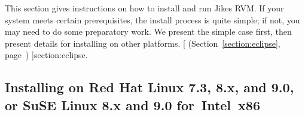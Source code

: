 \newcommand{\AtManualClasspathRootDiscussion}[1]{at
 \link{the discussion of setting up \texttt{CLASSPATH\_ROOT}#1}[; it's in
 Section~\ref{sec:manual-classpath-root}, item~\Ref,
 sub-item~\texttt{CLASS\-PATH\_\-ROOT}, on page~\Pageref]{manual-classpath-root}.}%
This section gives instructions on how to install and run Jikes\TMweb{} RVM.\@
If your system meets certain prerequisites, the install process is
quite simple; if not, you may need to do some preparatory work.  We
present the simple case first, then present details for installing
on other platforms.  
%
[
 (Section~\ref{section:eclipse}, page~\pageref{section:eclipse})%
]{section:eclipse}.\@

\subsection{Installing on Red Hat Linux 7.3, 8.x, and 9.0, or SuSE Linux 8.x and 9.0 for~Intel~x86}

